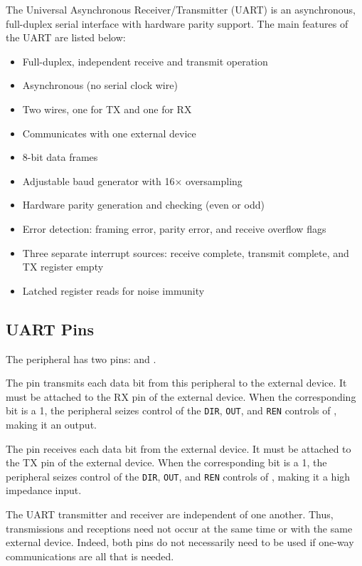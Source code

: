The Universal Asynchronous Receiver/Transmitter (UART) is an asynchronous, full-duplex serial interface with hardware parity support. The main features of the UART are listed below:

\begin{itemize}
	\item Full-duplex, independent receive and transmit operation
	\item Asynchronous (no serial clock wire)
	\item Two wires, one for TX and one for RX
	\item Communicates with one external device
	\item 8-bit data frames
	\item Adjustable baud generator with 16× oversampling
	\item Hardware parity generation and checking (even or odd)
	\item Error detection: framing error, parity error, and receive overflow flags
	\item Three separate interrupt sources: receive complete, transmit complete, and TX register empty
	\item Latched register reads for noise immunity
\end{itemize}



\subsection{UART Pins}

The  peripheral has two pins:  and .

The  pin transmits each data bit from this  peripheral to the external device. It must be attached to the RX pin of the external device. When the corresponding  bit is a 1, the  peripheral seizes control of the \texttt{DIR}, \texttt{OUT}, and \texttt{REN} controls of , making it an output.

The  pin receives each data bit from the external device. It must be attached to the TX pin of the external device. When the corresponding  bit is a 1, the  peripheral seizes control of the \texttt{DIR}, \texttt{OUT}, and \texttt{REN} controls of , making it a high impedance input.

The UART transmitter and receiver are independent of one another. Thus, transmissions and receptions need not occur at the same time or with the same external device. Indeed, both pins do not necessarily need to be used if one-way communications are all that is needed.

